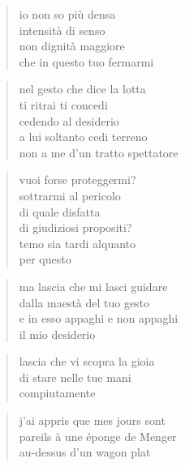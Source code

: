 
\vspace*{2cm}

	\begin{verse}
		io non so più densa\\
		intensità di senso\\
		non dignità maggiore\\
		che in questo tuo fermarmi
	\end{verse}

	\begin{verse}
		nel gesto che dice la lotta\\
		ti ritrai ti concedi\\
		cedendo al desiderio\\
		a lui soltanto cedi terreno\\
		non a me d'un tratto spettatore
	\end{verse}

	\begin{verse}
		vuoi forse proteggermi?\\
		sottrarmi al pericolo\\
		di quale disfatta\\
		di giudiziosi propositi?\\
		temo sia tardi alquanto\\
		per questo
	\end{verse}

	\begin{verse}
		ma lascia che mi lasci guidare\\
		dalla maestà del tuo gesto\\
		e in esso appaghi e non appaghi\\
		il mio desiderio
	\end{verse}

	\begin{verse}
		lascia che vi scopra la gioia\\
		di stare nelle tue mani\\
		compiutamente
	\end{verse}

\clearpage


\vspace*{2cm}

	\begin{otherlanguage}{french}
		\begin{verse}
			j'ai appris que mes jours sont\\
			pareils à une éponge de Menger\\
			au-dessus d'un wagon plat
		\end{verse}
	\end{otherlanguage}

